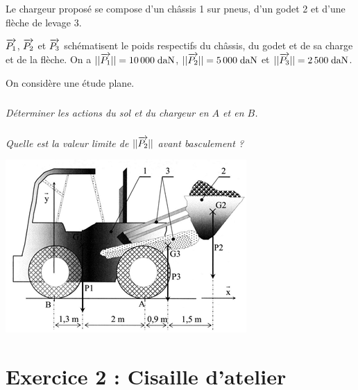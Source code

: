 \documentclass[10pt]{article}
\begin{document}
\begin{minipage}[c]{.58\linewidth}
Le chargeur proposé se compose d’un châssis 1 sur pneus, d’un godet 2 et d’une flèche de levage 3. 

$\overrightarrow{P_1}$, $\overrightarrow{P_2}$ et $\overrightarrow{P_3}$ schématisent le poids respectifs du châssis, du godet et de sa charge et de la flèche. On a $||\overrightarrow{P_1}|| = 10\, 000\; \text{daN}$, $||\overrightarrow{P_2}|| = 5\, 000\; \text{daN}$ et $||\overrightarrow{P_3}|| = 2\, 500\; \text{daN}$. 

On considère une étude plane.

\subparagraph{} \textit{Déterminer les actions du sol et du chargeur en $A$ et en $B$.}

\subparagraph{} \textit{Quelle est la valeur limite de $||\overrightarrow{P_2}||$ avant basculement ?}

\end{minipage} \hfill
\begin{minipage}[c]{.4\linewidth}
\begin{center}
\includegraphics[width=.95\textwidth]{images/fig1}
\end{center}
\end{minipage}

\setcounter{subparagraph}{0}

\section*{Exercice 2 : Cisaille d'atelier}
\end{document}
